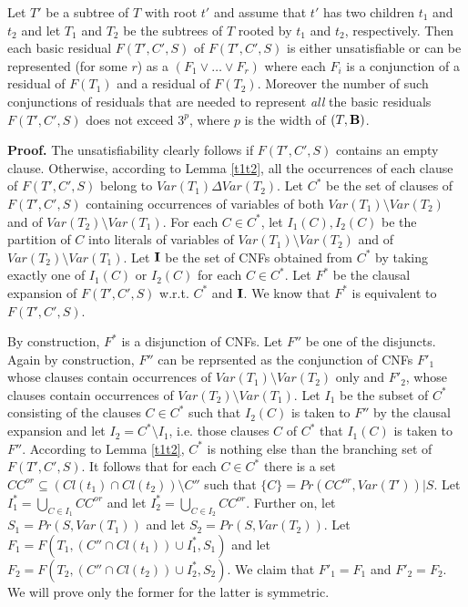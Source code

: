 \documentclass{llncs}
\begin{document}
\begin{lemma} \label{globaldisj}
Let $T'$ be a subtree of $T$ with root $t'$ and assume that $t'$ has two children $t_1$ and $t_2$ and let $T_1$
and $T_2$ be the subtrees of $T$ rooted by $t_1$ and $t_2$, respectively. Then each basic residual $F(T',C',S)$
of $F(T',C',S)$ is either  unsatisfiable or can be represented (for some $r$) 
as a $(F_1 \vee \dots \vee F_r)$ where 
each $F_i$ is a conjunction of a residual of $F(T_1)$ and a residual of $F(T_2)$.
Moreover the number of such conjunctions of residuals that are needed to represent \emph{all} the basic residuals
$F(T',C',S)$ does not exceed $3^p$, where $p$ is the width of $(T,{\bf B})$. 
\end{lemma}

{\bf Proof.}
The unsatisfiability clearly follows if $F(T',C',S)$ contains an empty clause.
Otherwise, according to Lemma \ref{t1t2}, all the occurrences of each clause of
$F(T',C',S)$ belong to $Var(T_1)\Delta Var(T_2)$. 
Let $C^*$ be the set of clauses of $F(T',C',S)$ containing occurrences
of variables of both $Var(T_1) \setminus Var(T_2)$ and of $Var(T_2) \setminus Var(T_1)$.
For each $C \in C^*$, let $I_1(C),I_2(C)$ be the partition of $C$ into literals of variables
of $Var(T_1) \setminus Var(T_2)$ and of $Var(T_2) \setminus Var(T_1)$.
Let ${\bf I}$ be the set of CNFs obtained from $C^*$ by taking exactly one of $I_1(C)$ or $I_2(C)$
for each $C \in C^*$. Let $F^*$ be the clausal expansion of $F(T',C',S)$ w.r.t. $C^*$ and ${\bf I}$.
We know that $F^*$ is equivalent to $F(T',C',S)$. 

By construction, $F^*$ is a disjunction of CNFs.
Let $F''$ be one of the disjuncts. Again by construction, $F''$ can be reprsented as the conjunction
of CNFs $F'_1$ whose clauses contain occurrences of $Var(T_1) \setminus Var(T_2)$ only and $F'_2$,
whose clauses contain occurrences of $Var(T_2) \setminus Var(T_1)$. Let $I_1$ be the subset of 
$C^*$ consisting of the clauses $C \in C^*$ such that $I_2(C)$ is taken to $F''$ by the clausal
expansion and let $I_2=C^* \setminus I_1$, i.e. those clauses $C$ of $C^*$ that $I_1(C)$ is taken
to $F''$. According  to Lemma \ref{t1t2}, $C^*$ is nothing else than the branching set of $F(T',C',S)$.
It follows that for each $C \in C^*$ there is a set $CC^{or} \subseteq (Cl(t_1) \cap Cl(t_2)) \setminus C''$
such that $\{C\}=Pr(CC^{or},Var(T'))|S$. Let $I^*_1=\bigcup_{C \in I_1} CC^{or}$ and let 
$I^*_2=\bigcup_{C \in I_2} CC^{or}$. Further on, let $S_1=Pr(S,Var(T_1))$ and let $S_2=Pr(S,Var(T_2))$.
Let $F_1=F(T_1,(C'' \cap Cl(t_1)) \cup I^*_1,S_1)$ and let $F_2=F(T_2,(C'' \cap Cl(t_2)) \cup I^*_2,S_2)$.
We claim that $F'_1=F_1$ and $F'_2=F_2$. We will prove only the former for the latter is symmetric.
\end{document}
